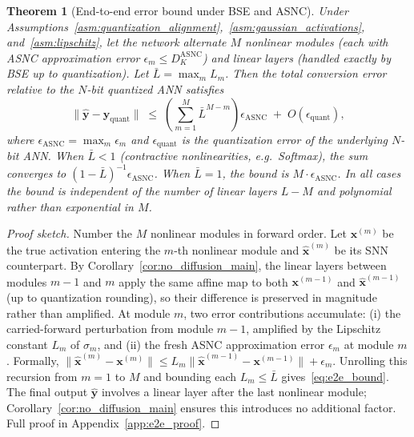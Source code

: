 \documentclass{article}
\theoremstyle{plain}
\newtheorem{theorem}{Theorem}[section]
\theoremstyle{definition}
\theoremstyle{remark}
\begin{document}
\begin{theorem}[End-to-end error bound under BSE and ASNC]
\label{thm:e2e_bound}
Under Assumptions~\ref{asm:quantization_alignment},~\ref{asm:gaussian_activations},
and~\ref{asm:lipschitz}, let the network alternate $M$ nonlinear modules (each with
ASNC approximation error $\epsilon_m \le D_K^{\mathrm{ASNC}}$) and linear layers
(handled exactly by BSE up to quantization). Let $\bar{L} = \max_m L_m$. Then the
total conversion error relative to the $N$-bit quantized ANN satisfies
\begin{equation}
\label{eq:e2e_bound}
\bigl\|\hat{\mathbf{y}} - \mathbf{y}_{\mathrm{quant}}\bigr\|
\;\le\;
\left(\sum_{m=1}^{M} \bar{L}^{M-m}\right) \epsilon_{\mathrm{ASNC}}
\;+\; O(\epsilon_{\mathrm{quant}}),
\end{equation}
where $\epsilon_{\mathrm{ASNC}} = \max_m \epsilon_m$ and $\epsilon_{\mathrm{quant}}$
is the quantization error of the underlying $N$-bit ANN. When $\bar{L} < 1$
(contractive nonlinearities, e.g.\ Softmax), the sum converges to
$(1-\bar{L})^{-1}\epsilon_{\mathrm{ASNC}}$. When $\bar{L} = 1$, the bound is
$M \cdot \epsilon_{\mathrm{ASNC}}$. In all cases the bound is
\emph{independent of the number of linear layers} $L - M$ and
\emph{polynomial rather than exponential in $M$}.
\end{theorem}

\begin{proof}[Proof sketch]
Number the $M$ nonlinear modules in forward order. Let $\mathbf{x}^{(m)}$ be the
true activation entering the $m$-th nonlinear module and $\hat{\mathbf{x}}^{(m)}$
be its SNN counterpart. By Corollary~\ref{cor:no_diffusion_main}, the linear layers
between modules $m-1$ and $m$ apply the same affine map to both $\mathbf{x}^{(m-1)}$
and $\hat{\mathbf{x}}^{(m-1)}$ (up to quantization rounding), so their difference is
preserved in magnitude rather than amplified. At module $m$, two error contributions
accumulate: (i) the carried-forward perturbation from module $m-1$, amplified by the
Lipschitz constant $L_m$ of $\sigma_m$, and (ii) the fresh ASNC approximation error
$\epsilon_m$ at module $m$. Formally, $\|\hat{\mathbf{x}}^{(m)} - \mathbf{x}^{(m)}\|
\le L_m\|\hat{\mathbf{x}}^{(m-1)} - \mathbf{x}^{(m-1)}\| + \epsilon_m$.
Unrolling this recursion from $m=1$ to $M$ and bounding each $L_m \le \bar{L}$
gives~\eqref{eq:e2e_bound}. The final output $\hat{\mathbf{y}}$ involves a linear
layer after the last nonlinear module; Corollary~\ref{cor:no_diffusion_main}
ensures this introduces no additional factor. Full proof in
Appendix~\ref{app:e2e_proof}.
\end{proof}
\end{document}
